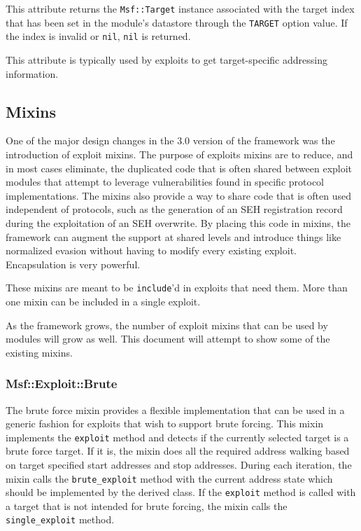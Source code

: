 \documentclass{report}
\begin{document}
\par
This attribute returns the \texttt{Msf::Target} instance associated
with the target index that has been set in the module's datastore
through the \texttt{TARGET} option value.  If the index is invalid
or \texttt{nil}, \texttt{nil} is returned.

\par
This attribute is typically used by exploits to get target-specific
addressing information.

        \subsection{Mixins}

\par
One of the major design changes in the 3.0 version of the framework
was the introduction of exploit mixins.  The purpose of exploits
mixins are to reduce, and in most cases eliminate, the duplicated
code that is often shared between exploit modules that attempt to
leverage vulnerabilities found in specific protocol implementations.
The mixins also provide a way to share code that is often used
independent of protocols, such as the generation of an SEH
registration record during the exploitation of an SEH overwrite.  By
placing this code in mixins, the framework can augment the support
at shared levels and introduce things like normalized evasion
without having to modify every existing exploit.  Encapsulation is
very powerful.

\par
These mixins are meant to be \texttt{include}'d in exploits that
need them.  More than one mixin can be included in a single exploit.

\par
As the framework grows, the number of exploit mixins that can be
used by modules will grow as well.  This document will attempt to
show some of the existing mixins.

            \subsubsection{Msf::Exploit::Brute}

\par
The brute force mixin provides a flexible implementation that can be
used in a generic fashion for exploits that wish to support brute
forcing.  This mixin implements the \texttt{exploit} method and
detects if the currently selected target is a brute force target. If
it is, the mixin does all the required address walking based on
target specified start addresses and stop addresses.  During each
iteration, the mixin calls the \texttt{brute\_exploit} method with
the current address state which should be implemented by the derived
class.  If the \texttt{exploit} method is called with a target that
is not intended for brute forcing, the mixin calls the
\texttt{single\_exploit} method.
\end{document}
